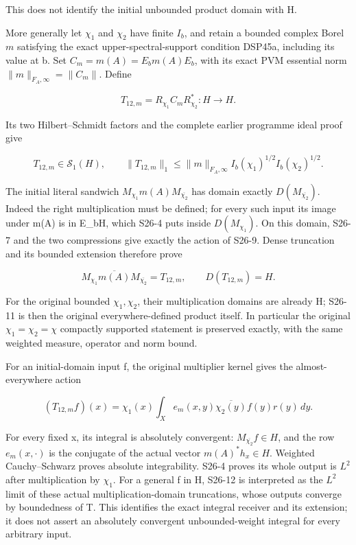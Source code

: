 \documentclass[
  11pt,
]{article}
\begin{document}
This does not identify the initial unbounded product domain with H.

More generally let \(\chi_1\) and \(\chi_2\) have finite \(I_b\), and
retain a bounded complex Borel \(m\) satisfying the exact
upper-spectral-support condition DSP45a, including its value at b. Set
\(C_m=m(A)=E_bm(A)E_b\), with its exact PVM essential norm
\(\|m\|_{F_A,\infty}=\|C_m\|\). Define

\[
T_{12,m}=R_{\chi_1}C_mR_{\chi_2}^*:H\longrightarrow H.
\tag{S26-9}
\]

Its two Hilbert--Schmidt factors and the complete earlier programme
ideal proof give

\[
T_{12,m}\in\mathcal S_1(H),\qquad
\|T_{12,m}\|_1
\le\|m\|_{F_A,\infty}
        I_b(\chi_1)^{1/2}I_b(\chi_2)^{1/2}.
\tag{S26-10}
\]

The initial literal sandwich \(M_{\chi_1}m(A)M_{\overline{\chi_2}}\) has
domain exactly \(D(M_{\overline{\chi_2}})\). Indeed the right
multiplication must be defined; for every such input its image under
m(A) is in E\_bH, which S26-4 puts inside \(D(M_{\chi_1})\). On this
domain, S26-7 and the two compressions give exactly the action of S26-9.
Dense truncation and its bounded extension therefore prove

\[
\overline{M_{\chi_1}m(A)M_{\overline{\chi_2}}}
=T_{12,m},\qquad D(T_{12,m})=H.
\tag{S26-11}
\]

For the original bounded \(\chi_1,\chi_2\), their multiplication domains
are already H; S26-11 is then the original everywhere-defined product
itself. In particular the original \(\chi_1=\chi_2=\chi\) compactly
supported statement is preserved exactly, with the same weighted
measure, operator and norm bound.

For an initial-domain input f, the original multiplier kernel gives the
almost-everywhere action

\[
(T_{12,m}f)(x)
=\chi_1(x)\int_Xe_m(x,y)\overline{\chi_2(y)}f(y)r(y)\,dy.
\tag{S26-12}
\]

For every fixed x, its integral is absolutely convergent:
\(M_{\overline{\chi_2}}f\in H\), and the row \(e_m(x,\cdot)\) is the
conjugate of the actual vector \(m(A)^*h_x\in H\). Weighted
Cauchy--Schwarz proves absolute integrability. S26-4 proves its whole
output is \(L^2\) after multiplication by \(\chi_1\). For a general f in
H, S26-12 is interpreted as the \(L^2\) limit of these actual
multiplication-domain truncations, whose outputs converge by boundedness
of T. This identifies the exact integral receiver and its extension; it
does not assert an absolutely convergent unbounded-weight integral for
every arbitrary input.
\end{document}
